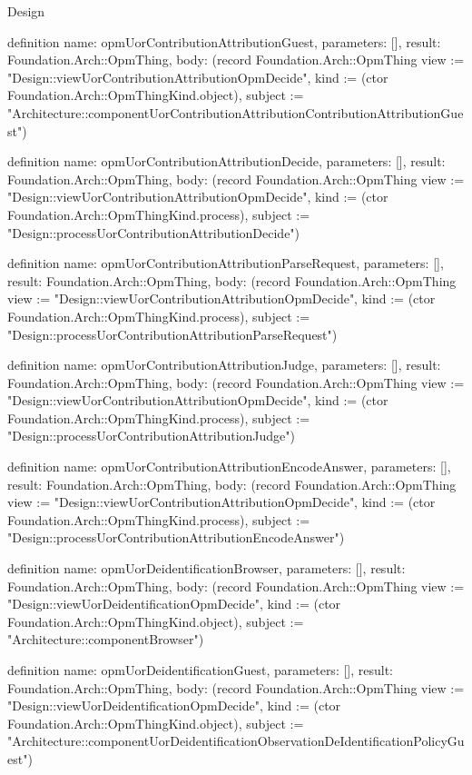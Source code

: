 \begin{lexlean}{Design}
\begin{semanticmodule}
definition{
  name: opmUorContributionAttributionGuest,
  parameters: [],
  result: Foundation.Arch::OpmThing,
  body: (record Foundation.Arch::OpmThing {view := "Design::viewUorContributionAttributionOpmDecide", kind := (ctor Foundation.Arch::OpmThingKind.object), subject := "Architecture::componentUorContributionAttributionContributionAttributionGuest"})
}

definition{
  name: opmUorContributionAttributionDecide,
  parameters: [],
  result: Foundation.Arch::OpmThing,
  body: (record Foundation.Arch::OpmThing {view := "Design::viewUorContributionAttributionOpmDecide", kind := (ctor Foundation.Arch::OpmThingKind.process), subject := "Design::processUorContributionAttributionDecide"})
}

definition{
  name: opmUorContributionAttributionParseRequest,
  parameters: [],
  result: Foundation.Arch::OpmThing,
  body: (record Foundation.Arch::OpmThing {view := "Design::viewUorContributionAttributionOpmDecide", kind := (ctor Foundation.Arch::OpmThingKind.process), subject := "Design::processUorContributionAttributionParseRequest"})
}

definition{
  name: opmUorContributionAttributionJudge,
  parameters: [],
  result: Foundation.Arch::OpmThing,
  body: (record Foundation.Arch::OpmThing {view := "Design::viewUorContributionAttributionOpmDecide", kind := (ctor Foundation.Arch::OpmThingKind.process), subject := "Design::processUorContributionAttributionJudge"})
}

definition{
  name: opmUorContributionAttributionEncodeAnswer,
  parameters: [],
  result: Foundation.Arch::OpmThing,
  body: (record Foundation.Arch::OpmThing {view := "Design::viewUorContributionAttributionOpmDecide", kind := (ctor Foundation.Arch::OpmThingKind.process), subject := "Design::processUorContributionAttributionEncodeAnswer"})
}

definition{
  name: opmUorDeidentificationBrowser,
  parameters: [],
  result: Foundation.Arch::OpmThing,
  body: (record Foundation.Arch::OpmThing {view := "Design::viewUorDeidentificationOpmDecide", kind := (ctor Foundation.Arch::OpmThingKind.object), subject := "Architecture::componentBrowser"})
}

definition{
  name: opmUorDeidentificationGuest,
  parameters: [],
  result: Foundation.Arch::OpmThing,
  body: (record Foundation.Arch::OpmThing {view := "Design::viewUorDeidentificationOpmDecide", kind := (ctor Foundation.Arch::OpmThingKind.object), subject := "Architecture::componentUorDeidentificationObservationDeIdentificationPolicyGuest"})
}


\end{semanticmodule}
\end{lexlean}
